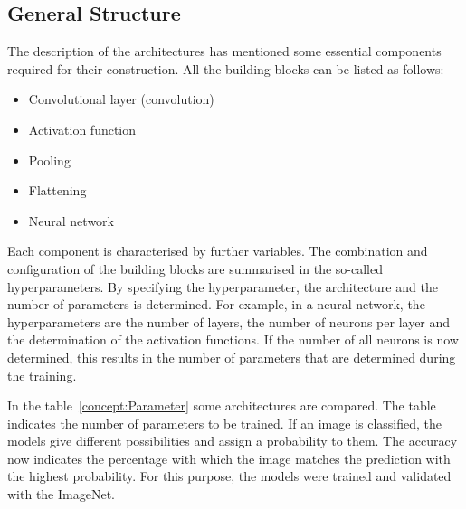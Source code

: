 {	
	\subsection{General Structure}
	
	
	
	The description of the architectures has mentioned some essential components required for their construction. All the building blocks can be listed as follows:\\
	
	\begin{itemize}
		\item Convolutional layer (convolution)
		\item Activation function
		\item Pooling
		\item Flattening
		\item Neural network
	\end{itemize}
	
	Each component is characterised by further variables. The combination and configuration of the building blocks are summarised in the so-called hyperparameters. By specifying the hyperparameter, the architecture and the number of parameters is determined. For example, in a neural network, the hyperparameters are the number of layers, the number of neurons per layer and the determination of the activation functions. If the number of all neurons is now determined, this results in the number of parameters that are determined during the training.
	
	In the table~\ref{concept:Parameter} some architectures are compared. The table indicates the number of parameters to be trained.  If an image is classified, the models give different possibilities and assign a probability to them. The accuracy now indicates the percentage with which the image matches the prediction with the highest probability. For this purpose, the models were trained and validated with the ImageNet. 
	
	
	
}
